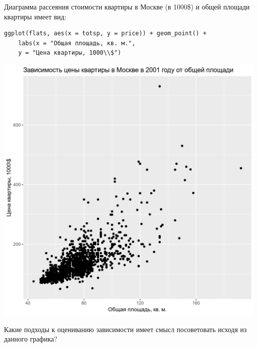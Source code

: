 \begin{problem}
Диаграмма рассеяния стоимости квартиры в Москве (в 1000\$) и общей площади квартиры имеет вид:


\begin{verbatim}
ggplot(flats, aes(x = totsp, y = price)) + geom_point() +
    labs(x = "Общая площадь, кв. м.",
    y = "Цена квартиры, 1000\\$")
\end{verbatim}



\begin{minipage}{0.6\textwidth}
\begin{center}
% 
\includegraphics[scale=0.65]{R_plots/flats_scatter.png}
\end{center}
\end{minipage}


Какие подходы к оцениванию зависимости имеет смысл посоветовать исходя из данного графика?




\end{problem}
